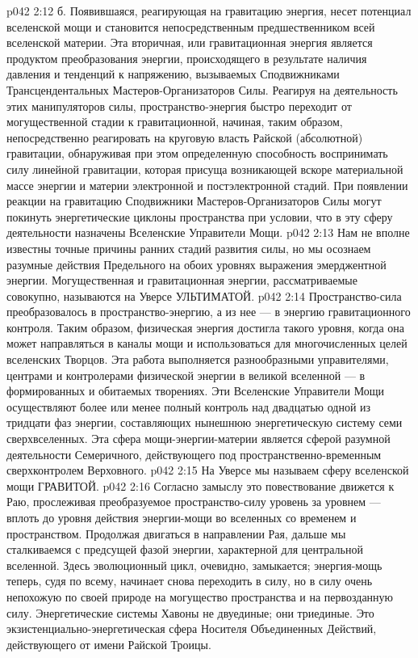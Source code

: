 \vs p042 2:12 \pc б.  Появившаяся, реагирующая на гравитацию энергия, несет потенциал вселенской мощи и становится непосредственным предшественником всей вселенской материи. Эта вторичная, или гравитационная энергия является продуктом преобразования энергии, происходящего в результате наличия давления и тенденций к напряжению, вызываемых Сподвижниками Трансцендентальных Мастеров\hyp{}Организаторов Силы. Реагируя на деятельность этих манипуляторов силы, пространство\hyp{}энергия быстро переходит от могущественной стадии к гравитационной, начиная, таким образом, непосредственно реагировать на круговую власть Райской (абсолютной) гравитации, обнаруживая при этом определенную способность воспринимать силу линейной гравитации, которая присуща возникающей вскоре материальной массе энергии и материи электронной и постэлектронной стадий. При появлении реакции на гравитацию Сподвижники Мастеров\hyp{}Организаторов Силы могут покинуть энергетические циклоны пространства при условии, что в эту сферу деятельности назначены Вселенские Управители Мощи.
\vs p042 2:13 \pc Нам не вполне известны точные причины ранних стадий развития силы, но мы осознаем разумные действия Предельного на обоих уровнях выражения эмерджентной энергии. Могущественная и гравитационная энергии, рассматриваемые совокупно, называются на Уверсе УЛЬТИМАТОЙ.
\vs p042 2:14 \bibnobreakspace {} Пространство\hyp{}сила преобразовалось в пространство\hyp{}энергию, а из нее --- в энергию гравитационного контроля. Таким образом, физическая энергия достигла такого уровня, когда она может направляться в каналы мощи и использоваться для многочисленных целей вселенских Творцов. Эта работа выполняется разнообразными управителями, центрами и контролерами физической энергии в великой вселенной --- в формированных и обитаемых творениях. Эти Вселенские Управители Мощи осуществляют более или менее полный контроль над двадцатью одной из тридцати фаз энергии, составляющих нынешнюю энергетическую систему семи сверхвселенных. Эта сфера мощи\hyp{}энергии\hyp{}материи является сферой разумной деятельности Семеричного, действующего под пространственно\hyp{}временным сверхконтролем Верховного.
\vs p042 2:15 На Уверсе мы называем сферу вселенской мощи ГРАВИТОЙ.
\vs p042 2:16 \bibnobreakspace {} Согласно замыслу это повествование движется к Раю, прослеживая преобразуемое пространство\hyp{}силу уровень за уровнем --- вплоть до уровня действия энергии\hyp{}мощи во вселенных со временем и пространством. Продолжая двигаться в направлении Рая, дальше мы сталкиваемся с предсущей фазой энергии, характерной для центральной вселенной. Здесь эволюционный цикл, очевидно, замыкается; энергия\hyp{}мощь теперь, судя по всему, начинает снова переходить в силу, но в силу очень непохожую по своей природе на могущество пространства и на первозданную силу. Энергетические системы Хавоны не двуединые; они триединые. Это экзистенциально\hyp{}энергетическая сфера Носителя Объединенных Действий, действующего от имени Райской Троицы.
